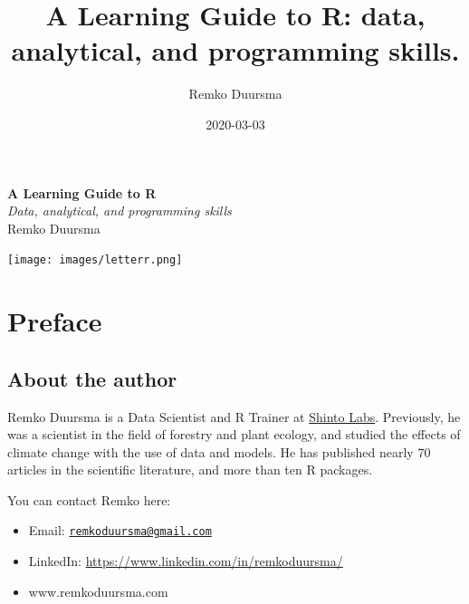 \documentclass[]{book}
\title{A Learning Guide to R: data, analytical, and programming skills.}
\author{Remko Duursma}
\date{2020-03-03}
\providecommand{\tightlist}{%
  \setlength{\itemsep}{0pt}\setlength{\parskip}{0pt}}
\let\oldmaketitle\maketitle
\begin{document}
\maketitle

\thispagestyle{empty}
\begin{center}

{ \Huge \textbf{A Learning Guide to R}}\\[0.4cm]
{ \large \textit{Data, analytical, and programming skills}} \\



\bigskip
\large{Remko Duursma}\\
\vfill

\texttt{[image: images/letterr.png]}\\[1cm]

\end{center}


\let\maketitle\oldmaketitle
\maketitle

{
\setcounter{tocdepth}{1}
\tableofcontents
}
\hypertarget{header1}{%
\chapter*{Preface}\label{header1}}

\hypertarget{aboutauthor}{%
\section*{About the author}\label{aboutauthor}}

Remko Duursma is a Data Scientist and R Trainer at \href{http://www.shintolabs.nl}{Shinto Labs}. Previously, he was a scientist in the field of forestry and plant ecology, and studied the effects of climate change with the use of data and models. He has published nearly 70 articles in the scientific literature, and more than ten R packages.

You can contact Remko here:

\begin{itemize}
\tightlist
\item
  Email: \href{mailto:remkoduursma@gmail.com}{\nolinkurl{remkoduursma@gmail.com}}
\item
  LinkedIn: \url{https://www.linkedin.com/in/remkoduursma/}
\item
  www.remkoduursma.com
\end{itemize}
\end{document}
